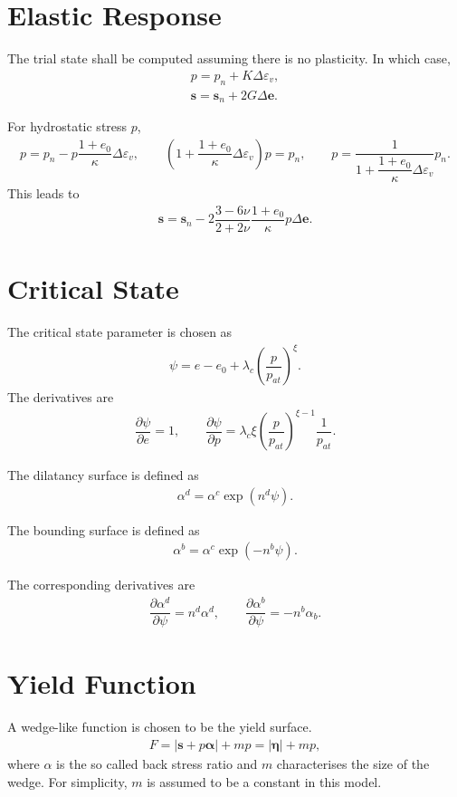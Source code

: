 \documentclass[11pt,a4paper]{article}
\newcommand*{\pfrac}[2]{\dfrac{\partial#1}{\partial#2}}
\begin{document}
\section{Elastic Response}
The trial state shall be computed assuming there is no plasticity. In which case,
\begin{gather}
p=p_n+K\Delta\varepsilon_v,\\
\mathbold{s}=\mathbold{s}_n+2G\Delta{}\mathbold{e}.
\end{gather}

For hydrostatic stress $p$,
\begin{gather}
p=p_n-p\dfrac{1+e_0}{\kappa}\Delta\varepsilon_v,\qquad
\left(1+\dfrac{1+e_0}{\kappa}\Delta\varepsilon_v\right)p=p_n,\qquad
p=\dfrac{1}{1+\dfrac{1+e_0}{\kappa}\Delta\varepsilon_v}p_n.
\end{gather}
This leads to
\begin{gather}
\mathbold{s}=\mathbold{s}_n-2\dfrac{3-6\nu}{2+2\nu}\dfrac{1+e_0}{\kappa}p\Delta{}\mathbold{e}.
\end{gather}
\section{Critical State}
The critical state parameter is chosen as
\begin{gather}
\psi=e-e_0+\lambda_c\left(\dfrac{p}{p_{at}}\right)^\xi.
\end{gather}
The derivatives are
\begin{gather}
\pfrac{\psi}{e}=1,\qquad
\pfrac{\psi}{p}=\lambda_c\xi\left(\dfrac{p}{p_{at}}\right)^{\xi-1}\dfrac{1}{p_{at}}.
\end{gather}

The dilatancy surface is defined as
\begin{gather}
\alpha^d=\alpha^c\exp\left(n^d\psi\right).
\end{gather}

The bounding surface is defined as
\begin{gather}
\alpha^b=\alpha^c\exp\left(-n^b\psi\right).
\end{gather}

The corresponding derivatives are
\begin{gather}
\pfrac{\alpha^d}{\psi}=n^d\alpha^d,\qquad\pfrac{\alpha^b}{\psi}=-n^b\alpha_b.
\end{gather}
\section{Yield Function}
A wedge-like function is chosen to be the yield surface.
\begin{gather}
F=\big|\mathbold{s}+p\mathbold{\alpha}\big|+mp=\big|\mathbold{\eta}\big|+mp,
\end{gather}
where $\alpha$ is the so called back stress ratio and $m$ characterises the size of the wedge. For simplicity, $m$ is assumed to be a constant in this model.
\end{document}

